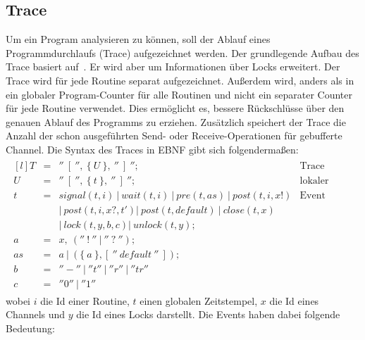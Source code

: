 \subsection{Trace}\label{chap:background-sec:trace}
Um ein Program analysieren zu können, soll der Ablauf eines Programmdurchlaufs
(Trace) aufgezeichnet werden. Der grundlegende Aufbau des Trace basiert auf~\cite{PPDP18}. 
Er wird aber um Informationen 
über Locks erweitert. Der Trace wird für jede Routine
separat aufgezeichnet. Außerdem wird, anders als in~\cite{PPDP18} ein globaler
Program-Counter für alle Routinen und nicht ein separater Counter für jede 
Routine verwendet. Dies ermöglicht es, bessere Rückschlüsse über den genauen 
Ablauf des Programms zu erziehen. Zusätzlich speichert der Trace die Anzahl 
der schon ausgeführten Send- oder Receive-Operationen für gebufferte Channel.
Die Syntax des Traces in EBNF gibt sich 
folgendermaßen:
\begin{align*}
  \begin{matrix*}[l]
    T & = & ''\ [\ '',\ \{\ U\ \},\ ''\ ]\ ''; & \text{Trace}\\
    U & = & ''\ [\ '',\ \{\ t\ \},\ ''\ ]\ ''; & \text{lokaler Trace} \\
    t & = & signal(t, i)\ |\ wait(t, i)\ |\ pre(t, as)\ |\ post(t, i, x!) & \text{Event}\\
      &   & |\ post(t, i, x?, t') |\ post(t, default)\ 
      |\ close(t, x)\  
      & \\
      &   & |\ lock(t, y, b, c) |\ unlock(t, y); & \\
    a & = & x,\ (''\ !\ ''\ |\ ''\ ?\ ''); & \\
    as & = & a\ |\ (\{\ a\ \}, [\ ''\ default\ ''\ ]); & \\
    b & = & ''-''\ |\ ''t''\ |\ ''r''\ |\ ''tr'' & \\
    c & = & ''0''\ |\ ''1''
  \end{matrix*}
\end{align*}
wobei $i$ die Id einer Routine, $t$ einen globalen Zeitstempel, $x$ die Id eines 
Channels und $y$ die Id eines Locks darstellt. Die Events haben dabei folgende Bedeutung:

